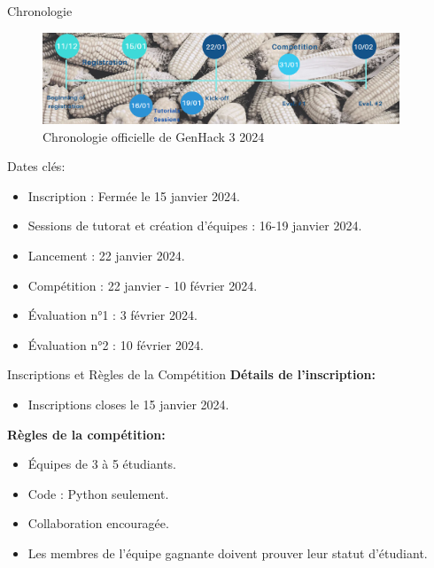 \documentclass[final]{beamer}
\newlength{\sepwidth}
\newlength{\colwidth}
\newcommand{\separatorcolumn}{\begin{column}{\sepwidth}\end{column}}
\begin{document}
\begin{frame}[t]
\begin{columns}[t]
\begin{column}{\colwidth}
\begin{column}{\colwidth}
    \begin{block}{Chronologie}
        \begin{figure}
            \centering
            \includegraphics[width=\columnwidth]{figures/2024-Timeline_2.png}
            \caption{Chronologie officielle de GenHack 3 2024 \cite{polytechniqueGenhackHackathon}}
            \label{fig:ftcat}
        \end{figure}
        Dates clés:
        \begin{itemize}
            \item Inscription : Fermée le 15 janvier 2024.
            \item Sessions de tutorat et création d'équipes : 16-19 janvier 2024.
            \item Lancement : 22 janvier 2024.
            \item Compétition : 22 janvier - 10 février 2024.
            \item Évaluation n°1 : 3 février 2024.
            \item Évaluation n°2 : 10 février 2024.
        \end{itemize}
    \end{block}

    \begin{block}{Inscriptions et Règles de la Compétition}
        \textbf{Détails de l'inscription:}
        \begin{itemize}
            \item Inscriptions closes le 15 janvier 2024.
        \end{itemize}
        
        \textbf{Règles de la compétition:}
        \begin{itemize}
            \item Équipes de 3 à 5 étudiants.
            \item Code : Python seulement.
            \item Collaboration encouragée.
            \item Les membres de l'équipe gagnante doivent prouver leur statut d'étudiant.
        \end{itemize}
    
    \end{block}
\end{column}

    

   
    
\end{column}

\separatorcolumn
\end{columns}



\end{frame}
\end{document}
